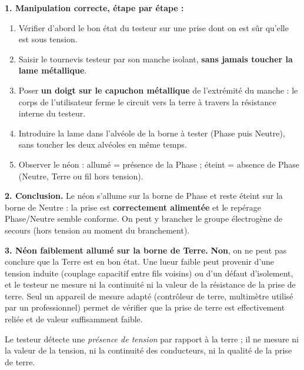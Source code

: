 \documentclass[11pt]{article}
\begin{document}
\begin{corrige}
\textbf{1. Manipulation correcte, étape par étape :}
\begin{enumerate}
\item Vérifier d'abord le bon état du testeur sur une prise dont on est sûr qu'elle est sous tension.
\item Saisir le tournevis testeur par son manche isolant, \textbf{sans jamais toucher la lame métallique}.
\item Poser \textbf{un doigt sur le capuchon métallique} de l'extrémité du manche : le corps de l'utilisateur ferme le circuit vers la terre à travers la résistance interne du testeur.
\item Introduire la lame dans l'alvéole de la borne à tester (Phase puis Neutre), sans toucher les deux alvéoles en même temps.
\item Observer le néon : allumé = présence de la Phase ; éteint = absence de Phase (Neutre, Terre ou fil hors tension).
\end{enumerate}

\textbf{2. Conclusion.} Le néon s'allume sur la borne de Phase et reste éteint sur la borne de Neutre : la prise est \textbf{correctement alimentée} et le repérage Phase/Neutre semble conforme. On peut y brancher le groupe électrogène de secours (hors tension au moment du branchement).

\textbf{3. Néon faiblement allumé sur la borne de Terre.} \textbf{Non}, on ne peut pas conclure que la Terre est en bon état. Une lueur faible peut provenir d'une tension induite (couplage capacitif entre fils voisins) ou d'un défaut d'isolement, et le testeur ne mesure ni la continuité ni la valeur de la résistance de la prise de terre. Seul un appareil de mesure adapté (contrôleur de terre, multimètre utilisé par un professionnel) permet de vérifier que la prise de terre est effectivement reliée et de valeur suffisamment faible.
\end{corrige}

\begin{attention}
Le testeur détecte une \emph{présence de tension} par rapport à la terre ; il ne mesure ni la valeur de la tension, ni la continuité des conducteurs, ni la qualité de la prise de terre.
\end{attention}
\end{document}

